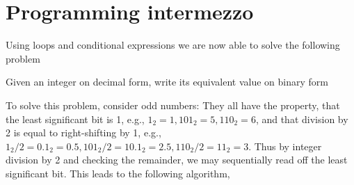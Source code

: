 \section{Programming intermezzo}
Using loops and conditional expressions we are now able to solve the following problem
\begin{problem}
  Given an integer on decimal form, write its equivalent value on binary form
\end{problem}
To solve this problem, consider odd numbers: They all have the property, that the least significant bit is 1, e.g., $1_2 = 1, 101_2 = 5, 110_2 = 6$, and that division by 2 is equal to right-shifting by 1, e.g., $1_2/2 = 0.1_2 = 0.5, 101_2/2 = 10.1_2 = 2.5, 110_2/2 = 11_2 = 3$. Thus by integer division by 2 and checking the remainder, we may sequentially read off the least significant bit. This leads to the following algorithm,
%
%




